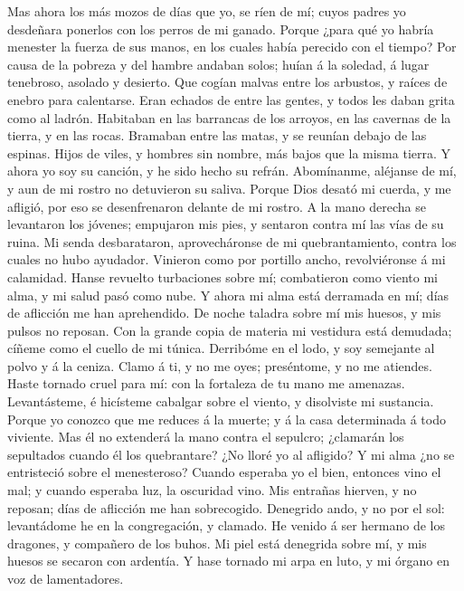  Mas ahora los más mozos de días que yo, se ríen de mí;
cuyos padres yo desdeñara ponerlos con los perros de mi ganado.
 Porque ¿para qué yo habría menester la fuerza de sus manos,
en los cuales había perecido con el tiempo?  Por causa de la
pobreza y del hambre andaban solos; huían á la soledad, á lugar
tenebroso, asolado y desierto.  Que cogían malvas entre los
arbustos, y raíces de enebro para calentarse.  Eran echados
de entre las gentes, y todos les daban grita como al ladrón.
 Habitaban en las barrancas de los arroyos, en las cavernas
de la tierra, y en las rocas.  Bramaban entre las matas, y
se reunían debajo de las espinas.  Hijos de viles, y hombres
sin nombre, más bajos que la misma tierra.  Y ahora yo soy
su canción, y he sido hecho su refrán.  Abomínanme,
aléjanse de mí, y aun de mi rostro no detuvieron su saliva.
 Porque Dios desató mi cuerda, y me afligió, por eso se
desenfrenaron delante de mi rostro.  A la mano derecha se
levantaron los jóvenes; empujaron mis pies, y sentaron contra mí las
vías de su ruina.  Mi senda desbarataron, aprovecháronse de
mi quebrantamiento, contra los cuales no hubo ayudador. 
Vinieron como por portillo ancho, revolviéronse á mi calamidad.
 Hanse revuelto turbaciones sobre mí; combatieron como
viento mi alma, y mi salud pasó como nube.  Y ahora mi alma
está derramada en mí; días de aflicción me han aprehendido.
 De noche taladra sobre mí mis huesos, y mis pulsos no
reposan.  Con la grande copia de materia mi vestidura está
demudada; cíñeme como el cuello de mi túnica.  Derribóme en
el lodo, y soy semejante al polvo y á la ceniza.  Clamo á
ti, y no me oyes; preséntome, y no me atiendes.  Haste
tornado cruel para mí: con la fortaleza de tu mano me amenazas.
 Levantásteme, é hicísteme cabalgar sobre el viento, y
disolviste mi sustancia.  Porque yo conozco que me reduces
á la muerte; y á la casa determinada á todo viviente.  Mas
él no extenderá la mano contra el sepulcro; ¿clamarán los sepultados
cuando él los quebrantare?  ¿No lloré yo al afligido? Y mi
alma ¿no se entristeció sobre el menesteroso?  Cuando
esperaba yo el bien, entonces vino el mal; y cuando esperaba luz, la
oscuridad vino.  Mis entrañas hierven, y no reposan; días
de aflicción me han sobrecogido.  Denegrido ando, y no por
el sol: levantádome he en la congregación, y clamado.  He
venido á ser hermano de los dragones, y compañero de los buhos.
 Mi piel está denegrida sobre mí, y mis huesos se secaron
con ardentía.  Y hase tornado mi arpa en luto, y mi órgano
en voz de lamentadores.

